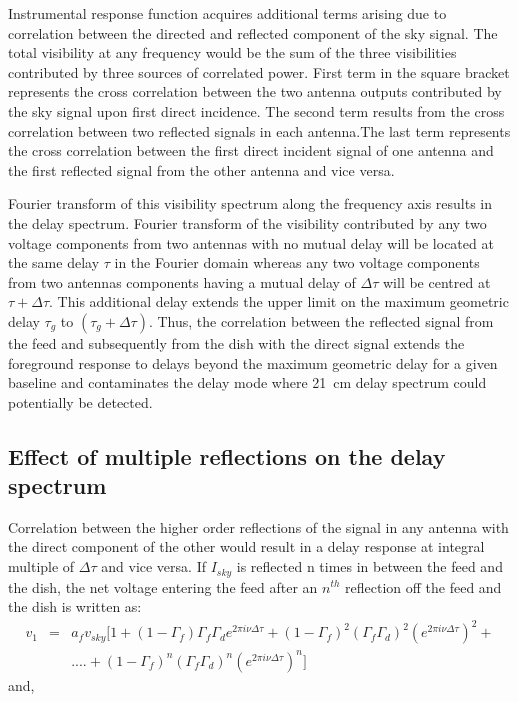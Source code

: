 \documentclass[iop]{emulateapj}
\newcommand{\volt}{{v}}
\newcommand{\dfngexp}{{e^{2\pi i\nu \Delta \tau}}}
\begin{document}
Instrumental response function acquires additional terms arising due to correlation between the directed and reflected component of the sky signal. The total visibility at any frequency would be the sum of the three visibilities contributed by three sources of correlated power. First term in the square bracket represents the cross correlation between the two antenna outputs contributed by the sky signal upon first direct incidence. The second term results from the cross correlation between two reflected signals in each antenna.The last term represents the cross correlation between the first direct incident signal of one antenna and the first reflected signal from the other antenna and vice versa.

Fourier transform of this visibility spectrum along the frequency axis results in the delay spectrum. 
 Fourier transform of the visibility contributed by any two voltage components from two antennas with no mutual delay will be located at the same delay $\tau$ in the Fourier domain whereas any two voltage components from two antennas components having a mutual delay of $\Delta \tau$ will be centred at $\tau+\Delta \tau$. This additional delay extends the upper limit on the maximum geometric delay $\tau_{g}$ to $(\tau_{g}+\Delta \tau)$.
 Thus, the correlation between the reflected signal  from the feed and subsequently from the dish with the direct signal extends the foreground response to delays beyond the maximum geometric delay for a given baseline and contaminates the delay mode where 21~cm delay spectrum could potentially be detected. 
 

\subsection{Effect of multiple reflections on the delay spectrum} 
Correlation between the higher order reflections of the signal in any antenna with the direct component of the other would result in a delay response at integral multiple of $\Delta \tau$ and vice versa. 
If $I_{sky}$ is reflected n times in between the feed and the dish, the net voltage entering the feed after an
$n^{th}$ reflection off the feed and the dish is written as:
\begin{eqnarray}
\volt_{1} & = &  a_{f} \volt_{sky}[1+ (1-\Gamma_{f})\Gamma_{f}\Gamma_{d} \dfngexp + (1-\Gamma_{f})^{2} (\Gamma_{f}\Gamma_{d})^2  (\dfngexp)^{2}+ \nonumber \\
&&  ....+ (1-\Gamma_{f})^{n}(\Gamma_{f}\Gamma_{d})^{n} (\dfngexp)^{n}] \nonumber
\end{eqnarray}
and, 
\end{document}
